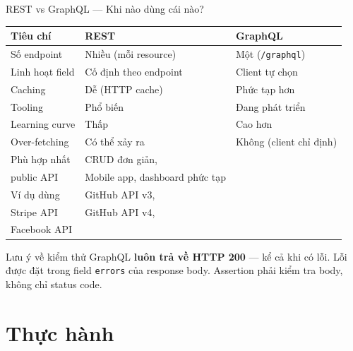 \documentclass[aspectratio=169,10pt]{beamer}
\begin{document}
\begin{frame}{REST vs GraphQL --- Khi nào dùng cái nào?}
  \begin{center}
  \small
  \begin{tabular}{p{3cm}p{3.5cm}p{3.5cm}}
    \toprule
    \textbf{Tiêu chí} & \textbf{REST} & \textbf{GraphQL} \\
    \midrule
    Số endpoint    & Nhiều (mỗi resource) & Một (\texttt{/graphql}) \\
    Linh hoạt field & Cố định theo endpoint & Client tự chọn \\
    Caching        & Dễ (HTTP cache)  & Phức tạp hơn \\
    Tooling        & Phổ biến         & Đang phát triển \\
    Learning curve & Thấp             & Cao hơn \\
    Over-fetching  & Có thể xảy ra    & Không (client chỉ định) \\
    Phù hợp nhất   & CRUD đơn giản,\\public API & Mobile app, dashboard phức tạp \\
    Ví dụ dùng     & GitHub API v3,\\Stripe API & GitHub API v4,\\Facebook API \\
    \bottomrule
  \end{tabular}
  \end{center}

  \vspace{0.2em}
  \begin{alertblock}{Lưu ý về kiểm thử}
    GraphQL \textbf{luôn trả về HTTP 200} --- kể cả khi có lỗi.
    Lỗi được đặt trong field \texttt{errors} của response body.
    Assertion phải kiểm tra body, không chỉ status code.
  \end{alertblock}
\end{frame}

\section{Thực hành}
\end{document}
